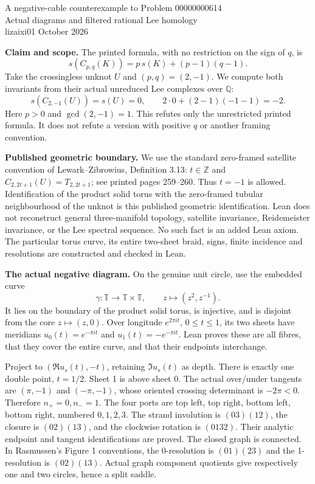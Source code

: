 \documentclass[11pt]{article}
\newcommand{\Q}{\mathbb Q}
\newcommand{\Z}{\mathbb Z}
\newcommand{\T}{\mathbb T}
\begin{document}
\begin{center}
{\Large A negative-cable counterexample to Problem 00000000614}\\[5pt]
{\large Actual diagrams and filtered rational Lee homology}\\[3pt]
lizaixi01 October 2026
\end{center}

\textbf{Claim and scope.}
The printed formula, with no restriction on the sign of $q$, is
\[
 s(C_{p,q}(K))=p\,s(K)+(p-1)(q-1).
\]
Take the crossingless unknot $U$ and $(p,q)=(2,-1)$. We compute both
invariants from their actual unreduced Lee complexes over $\Q$:
\[
 s(C_{2,-1}(U))=s(U)=0,\qquad
 2\cdot0+(2-1)(-1-1)=-2.
\]
Here $p>0$ and $\gcd(2,-1)=1$. This refutes only the unrestricted printed
formula. It does not refute a version with positive $q$ or another framing
convention.

\textbf{Published geometric boundary.}
We use the standard zero-framed satellite convention of
Lewark--Zibrowius, Definition 3.13: $t\in\Z$ and
$C_{2,2t+1}(U)=T_{2,2t+1}$; see printed pages 259--260.
Thus $t=-1$ is allowed. Identification of the product solid torus with the
zero-framed tubular neighbourhood of the unknot is this published geometric
identification. Lean does not reconstruct general three-manifold topology,
satellite invariance, Reidemeister invariance, or the Lee spectral sequence.
No such fact is an added Lean axiom. The particular torus curve, its entire
two-sheet braid, signs, finite incidence and resolutions are constructed
and checked in Lean.

\textbf{The actual negative diagram.}
On the genuine unit circle, use the embedded curve
\[
 \gamma:\T\longrightarrow\T\times\T,\qquad z\longmapsto(z^2,z^{-1}).
\]
It lies on the boundary of the product solid torus, is injective, and is
disjoint from the core $z\mapsto(z,0)$. Over longitude $e^{2\pi it}$,
$0\le t\le1$, its two sheets have meridians
$u_0(t)=e^{-\pi it}$ and $u_1(t)=-e^{-\pi it}$.
Lean proves these are all fibres, that they cover the entire curve, and
that their endpoints interchange.

Project to $(\Re u_s(t),-t)$, retaining $\Im u_s(t)$ as depth.
There is exactly one double point, $t=1/2$. Sheet 1 is above sheet 0.
The actual over/under tangents are $(\pi,-1)$ and $(-\pi,-1)$, whose
oriented crossing determinant is $-2\pi<0$. Therefore $n_+=0,n_-=1$.
The four ports are top left, top right, bottom left, bottom right,
numbered $0,1,2,3$. The strand involution is $(03)(12)$, the closure is
$(02)(13)$, and the clockwise rotation is $(0132)$. Their analytic
endpoint and tangent identifications are proved. The closed graph is
connected. In Rasmussen's Figure 1 conventions, the 0-resolution is
$(01)(23)$ and the 1-resolution is $(02)(13)$. Actual graph component
quotients give respectively one and two circles, hence a split saddle.
\end{document}
